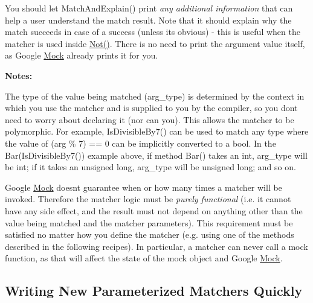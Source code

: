 You should let {\ttfamily Match\+And\+Explain()} print {\itshape any additional information} that can help a user understand the match result. Note that it should explain why the match succeeds in case of a success (unless it\textquotesingle{}s obvious) -\/ this is useful when the matcher is used inside {\ttfamily \hyperlink{namespacetesting_a3d7d0dda7e51b13fe2f5aa28e23ed6b6}{Not()}}. There is no need to print the argument value itself, as Google \hyperlink{class_mock}{Mock} already prints it for you.

{\bfseries Notes\+:}


\begin{DoxyEnumerate}
\item The type of the value being matched ({\ttfamily arg\+\_\+type}) is determined by the context in which you use the matcher and is supplied to you by the compiler, so you don\textquotesingle{}t need to worry about declaring it (nor can you). This allows the matcher to be polymorphic. For example, {\ttfamily Is\+Divisible\+By7()} can be used to match any type where the value of {\ttfamily (arg \% 7) == 0} can be implicitly converted to a {\ttfamily bool}. In the {\ttfamily Bar(\+Is\+Divisible\+By7())} example above, if method {\ttfamily Bar()} takes an {\ttfamily int}, {\ttfamily arg\+\_\+type} will be {\ttfamily int}; if it takes an {\ttfamily unsigned long}, {\ttfamily arg\+\_\+type} will be {\ttfamily unsigned long}; and so on.
\end{DoxyEnumerate}
\begin{DoxyEnumerate}
\item Google \hyperlink{class_mock}{Mock} doesn\textquotesingle{}t guarantee when or how many times a matcher will be invoked. Therefore the matcher logic must be {\itshape purely functional} (i.\+e. it cannot have any side effect, and the result must not depend on anything other than the value being matched and the matcher parameters). This requirement must be satisfied no matter how you define the matcher (e.\+g. using one of the methods described in the following recipes). In particular, a matcher can never call a mock function, as that will affect the state of the mock object and Google \hyperlink{class_mock}{Mock}.
\end{DoxyEnumerate}

\subsection*{Writing New Parameterized Matchers Quickly}

